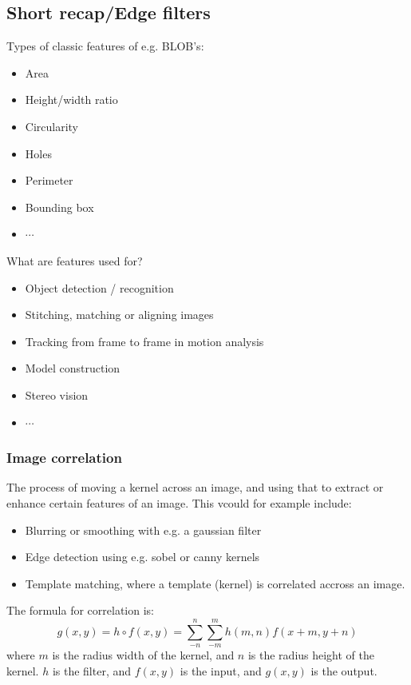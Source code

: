 \documentclass[a4paper]{article}
\begin{document}
\subsection*{Short recap/Edge filters}
Types of classic features of e.g. BLOB's:
\begin{itemize}
	\item Area
	\item Height/width ratio
	\item Circularity
	\item Holes
	\item Perimeter
	\item Bounding box
	\item $ \cdots $
\end{itemize}
What are features used for?
\begin{itemize}
	\item Object detection / recognition
	\item Stitching, matching or aligning images
	\item Tracking from frame to frame in motion analysis
	\item Model construction
	\item Stereo vision
	\item $ \cdots $
\end{itemize}

\subsubsection*{Image correlation}
The process of moving a kernel across an image, and using that to extract or enhance certain features of an image. This vcould for example include: 
\begin{itemize}
	\item Blurring or smoothing with e.g. a gaussian filter
	\item Edge detection using e.g. sobel or canny kernels
	\item Template matching, where a template (kernel) is correlated accross an image.
\end{itemize}

The formula for correlation is:
\begin{equation} \label{eq:correlation}
g(x,y) = h \circ f(x,y) = \sum_{-n}^{n}{\sum_{-m}^{m}{h(m,n)f(x+m, y+n)}}
\end{equation}
where $ m $ is the radius width of the kernel, and  $ n $ is the radius height of the kernel. $ h $ is the filter, and $ f(x,y) $ is the input, and $ g(x,y) $ is the output. 
\end{document}
